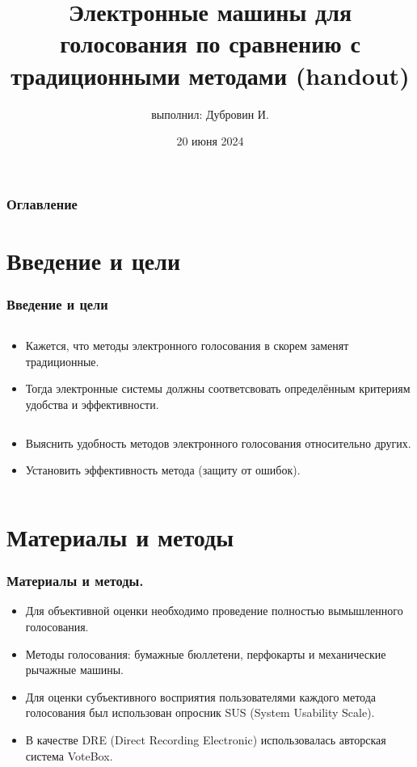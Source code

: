 \documentclass[11pt]{beamer}
\date{20 июня 2024}
\title{Электронные машины для голосования по сравнению с традиционными методами (handout)}
\author{выполнил: Дубровин И.}
\begin{document}
\frame{\titlepage}

\begin{frame}
\frametitle{Оглавление}
\tableofcontents
\end{frame}

\section{Введение и цели}

\begin{frame}
\frametitle{Введение и цели}
    \begin{column}[h]{0.5\linewidth}  
        \begin{itemize}
        \item Кажется, что методы электронного голосования в скорем \alert{заменят} традиционные.\newline
        \item Тогда электронные системы должны соответсвовать определённым критериям \alert{удобства} и \alert{эффективности}.
        \end{itemize}
    \end{column}
    \begin{column}[h]{0.5\linewidth}
        \begin{itemize}
        \item Выяснить удобность методов электронного голосования относительно других. \newline
        
        \item Установить эффективность метода (защиту от ошибок).
        \end{itemize}
    \end{column}
\end{frame}

\section{Материалы и методы}

\begin{frame}
\frametitle{Материалы и методы.}

    \begin{itemize}
        \item \small Для объективной оценки необходимо проведение полностью вымышленного голосования.\newline
        
        \item \small Методы голосования: бумажные бюллетени, перфокарты и механические рычажные машины.\newline

        \item \small Для оценки субъективного восприятия пользователями каждого метода голосования был использован опросник SUS (System Usability Scale). \newline

        \item \small В качестве DRE (Direct Recording Electronic) использовалась авторская система \alert{VoteBox}.
    \end{itemize}
\end{frame}
\end{document}
